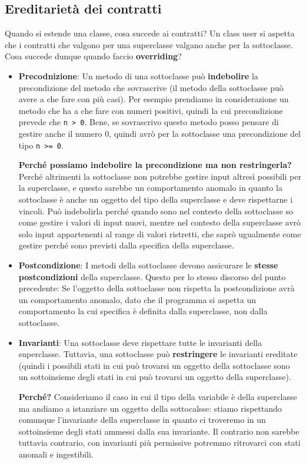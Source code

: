         \subsection{Ereditarietà dei contratti} Quando si estende una classe, cosa succede ai contratti? Un class user si aspetta che i contratti che valgono per una superclasse valgano anche per la sottoclasse. Cosa succede dunque quando faccio \textbf{overriding}?
        \begin{itemize}
            \item \textbf{Precodnizione}: Un metodo di una sottoclasse può \textbf{indebolire} la precondizione del metodo che sovrascrive (il metodo della sottoclasse può avere a che fare con più casi). Per esempio prendiamo in considerazione un metodo che ha a che fare con numeri positivi, quindi la cui precondizione prevede che \texttt{n > 0}. Bene, se sovrascrivo questo metodo posso pensare di gestire anche il numero 0, quindi avrò per la sottoclasse una precondizione del tipo \texttt{n >= 0}.
            
            \textbf{Perché possiamo indebolire la precondizione ma non restringerla?} Perché altrimenti la sottoclasse non potrebbe gestire input altresì possibili per la superclasse, e questo sarebbe un comportamento anomalo in quanto la sottoclasse è anche un oggetto del tipo della superclasse e deve rispettarne i vincoli. Può indebolirla perché quando sono nel contesto della sottoclasse so come gestire i valori di input nuovi, mentre nel contesto della superclasse avrò solo input appartenenti al range di valori ristretti, che saprò ugualmente come gestire perché sono previsti dalla specifica della superclasse.
            
            \item \textbf{Postcondizione}: I metodi della sottoclasse devono assicurare le \textbf{stesse postcondizioni} della superclasse. Questo per lo stesso discorso del punto precedente: Se l'oggetto della sottoclasse non rispetta la postcondizione avrà un comportamento anomalo, dato che il programma si aspetta un comportamento la cui specifica è definita dalla superclasse, non dalla sottoclasse.
            
            \item \textbf{Invarianti}: Una sottoclasse deve rispettare tutte le invarianti della superclasse. Tuttavia, una sottoclasse può \textbf{restringere} le invarianti ereditate (quindi i possibili stati in cui può trovarsi un oggetto della sottoclasse sono un sottoinsieme degli stati in cui può trovarsi un oggetto della superclasse).
            
            \textbf{Perché?} Consideriamo il caso in cui il tipo della variabile è della superclasse ma andiamo a istanziare un oggetto della sottocalsse: stiamo rispettando comunque l'invariante della superclasse in quanto ci troveremo in un sottoinsieme degli stati ammessi dalla sua invariante. Il contrario non sarebbe tuttavia contrario, con invarianti più permissive potremmo ritrovarci con stati anomali e ingestibili.
        \end{itemize}
        
